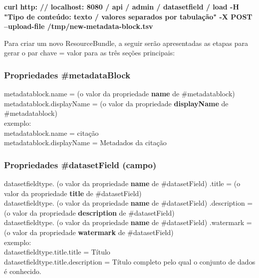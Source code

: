 \documentclass[12pt,hidelinks]{article}
\begin{document}
\textbf{curl http: // localhost: 8080 / api / admin / datasetfield / load -H "Tipo de conteúdo: texto / valores separados por tabulação" -X POST --upload-file /tmp/new-metadata-block.tsv}

Para criar um novo ResourceBundle, a seguir serão apresentadas as etapas para gerar o par chave = valor para as três seções principais:

\subsubsection{Propriedades \#metadataBlock}

\qquad metadatablock.name = (o valor da propriedade \textbf{name} de \#metadatablock)\\

metadatablock.displayName = (o valor da propriedade \textbf{displayName} de \#metadatablock)\\

exemplo:\\

metadatablock.name = citação\\

metadatablock.displayName = Metadados da citação

\subsubsection{Propriedades \#datasetField (campo)}

\qquad datasetfieldtype. (o valor da propriedade \textbf{name} de \#datasetField) .title = (o valor da propriedade \textbf{title} de \#datasetField)\\

datasetfieldtype. (o valor da propriedade \textbf{name} de \#datasetField) .description = (o valor da propriedade \textbf{description} de \#datasetField)\\

datasetfieldtype. (o valor da propriedade \textbf{name} de \#datasetField) .watermark = (o valor da propriedade \textbf{watermark} de \#datasetField)\\

exemplo:\\

datasetfieldtype.title.title = Título\\

datasetfieldtype.title.description = Título completo pelo qual o conjunto de dados é conhecido.\\
\end{document}
